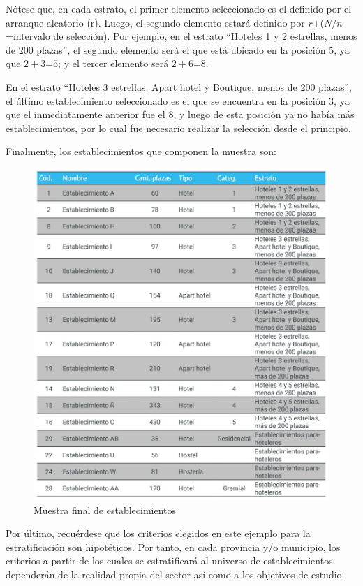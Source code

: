 \documentclass[
]{book}
\begin{document}
Nótese que, en cada estrato, el primer elemento seleccionado es el definido por el arranque aleatorio (r). Luego, el segundo elemento estará definido por \(r\)+(\(N/n\)=intervalo de selección). Por ejemplo, en el estrato ``Hoteles 1 y 2 estrellas, menos de 200 plazas'', el segundo elemento será el que está ubicado en la posición 5, ya que \(2+3\)=\(5\); y el tercer elemento será \(2+6\)=\(8\).

En el estrato ``Hoteles 3 estrellas, Apart hotel y Boutique, menos de 200 plazas'', el último establecimiento seleccionado es el que se encuentra en la posición 3, ya que el inmediatamente anterior fue el 8, y luego de esta posición ya no había más establecimientos, por lo cual fue necesario realizar la selección desde el principio.

Finalmente, los establecimientos que componen la muestra son:

\begin{figure}

{\centering \includegraphics[width=0.8\linewidth]{imagenes/tabla_4} 

}

\caption{Muestra final de establecimientos}\label{fig:muestra-final}
\end{figure}

Por último, recuérdese que los criterios elegidos en este ejemplo para la estratificación son hipotéticos. Por tanto, en cada provincia y/o municipio, los criterios a partir de los cuales se estratificará al universo de establecimientos dependerán de la realidad propia del sector así como a los objetivos de estudio.
\end{document}
